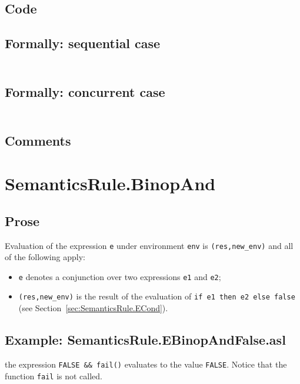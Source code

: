 \documentclass{book}
\begin{document}
  \subsection{Code}

  \subsection{Formally: sequential case}
  \begin{align}
  \end{align} 

  \subsection{Formally: concurrent case}
  \begin{align}
  \end{align} 

  \subsection{Comments}

\section{SemanticsRule.BinopAnd \label{sec:SemanticsRule.BinopAnd}}

  \subsection{Prose}
  Evaluation of the expression \texttt{e} under environment \texttt{env} is
  \texttt{(res,new\_env)} and all of the following apply:
  \begin{itemize}
  \item \texttt{e} denotes a conjunction over two expressions \texttt{e1} and \texttt{e2};
  \item \texttt{(res,new\_env)} is the result of the evaluation of \texttt{if
e1 then e2 else false} (see Section~\ref{sec:SemanticsRule.ECond}).
  \end{itemize}

  \subsection{Example: SemanticsRule.EBinopAndFalse.asl}

    the expression \texttt{FALSE \&\& fail()} evaluates to the value \texttt{FALSE}. Notice that the function \texttt{fail} is not called.
\end{document}
